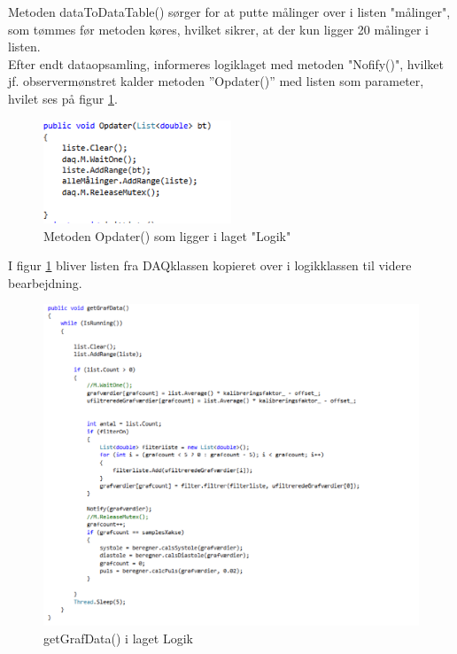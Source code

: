 Metoden dataToDataTable() sørger for at putte målinger over i listen "målinger", som tømmes før metoden køres, hvilket sikrer, at der kun ligger 20 målinger i listen.\\
Efter endt dataopsamling, informeres logiklaget med metoden "Nofify()", hvilket jf. observermønstret kalder metoden ”Opdater()” med listen som parameter, hvilet ses på figur \ref{kode5}.

\begin{figure}[H]
	\includegraphics[width=0.5\textwidth]{Figurer/Jeppe/5}
	\caption{Metoden Opdater() som ligger i laget "Logik"}
	\label{kode5}
\end{figure}

I figur \ref{kode5} bliver listen fra DAQklassen kopieret over i logikklassen til videre bearbejdning. 

\begin{figure}[H]
	\includegraphics[width=1.2\textwidth]{Figurer/Jeppe/6}
	\caption{getGrafData() i laget Logik}
	\label{kode6}
\end{figure}

